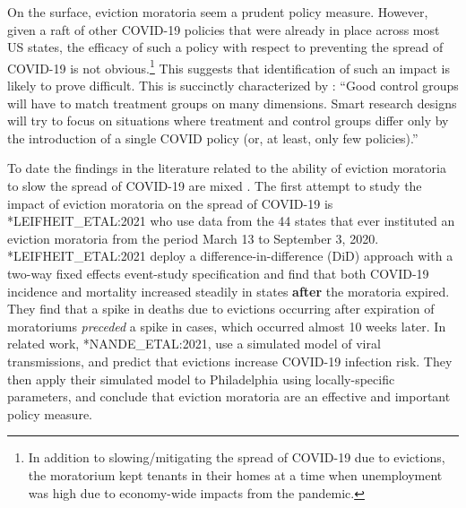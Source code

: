 \documentclass[12pt]{amsart}
\begin{document}

On the surface, eviction moratoria seem a prudent policy measure. However, given a raft of other COVID-19 policies that were already in place across most US states, the efficacy of such a policy with respect to preventing the spread of COVID-19 is not obvious.\footnote{In addition to slowing/mitigating the spread of COVID-19 due to evictions, the moratorium kept tenants in their homes at a time when unemployment was high due to economy-wide impacts from the pandemic.} This suggests that identification of such an impact is likely to prove difficult. This is succinctly characterized by : ``Good control groups will have to match treatment groups on many dimensions. Smart research designs will try to focus on situations where treatment and control groups differ only by the introduction of a single COVID policy (or, at least, only few policies).'' 

To date the findings in the literature related to the ability of eviction moratoria to slow the spread of COVID-19 are mixed . The first attempt to study the impact of eviction moratoria on the spread of COVID-19 is \citeasnoun**{LEIFHEIT_ETAL:2021} who use data from the 44 states that ever instituted an eviction moratoria from the period March 13 to September 3, 2020. \citeasnoun**{LEIFHEIT_ETAL:2021} deploy a difference-in-difference (DiD) approach with a two-way fixed effects event-study specification and find that both COVID-19 incidence and mortality increased steadily in states \textbf{after} the moratoria expired. They find that a spike in deaths due to evictions occurring after expiration of moratoriums \textit{preceded} a spike in cases, which occurred almost 10 weeks later. In related work, \citeasnoun**{NANDE_ETAL:2021}, use a simulated model of viral transmissions, and predict that evictions increase COVID-19 infection risk. They then apply their simulated model to Philadelphia using locally-specific parameters, and conclude that eviction moratoria are an effective and important policy measure. 
\end{document}
